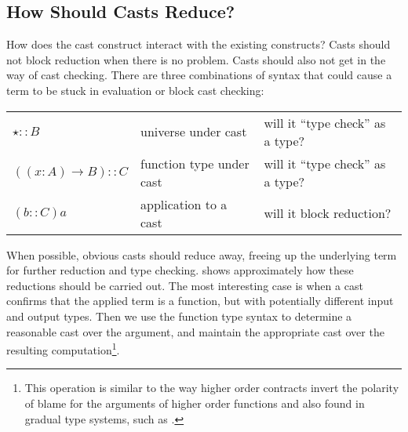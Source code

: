 \subsection{How Should Casts Reduce?}

How does the cast construct interact with the existing constructs?
Casts should not block reduction when there is no problem.
Casts should also not get in the way of cast checking.
There are three combinations of syntax that could cause a term to be stuck in evaluation or block cast checking:

\begin{tabular}{lll}
$\star::B$ & universe under cast & will it ``type check'' as a type?\tabularnewline
$\left(\left(x:A\right)\rightarrow B\right)::C$ & function type under cast & will it ``type check'' as a type?\tabularnewline
$\left(b::C\right)a$ & application to a cast & will it block reduction?\tabularnewline
\end{tabular}

When possible, obvious casts should reduce away, freeing up the underlying term for further reduction and type checking.
 shows approximately how these reductions should be carried out.
The most interesting case is when a cast confirms that the applied term is a function, but with potentially different input and output types.
Then we use the function type syntax to determine a reasonable cast over the argument, and maintain the appropriate cast over the resulting computation\footnote{
  This operation is similar to the way higher order contracts invert the polarity of blame for the arguments of higher order functions \cite{10.1145/581478.581484} and also found in gradual type systems, such as \cite{10.1007/978-3-642-00590-9_1}.
}.


